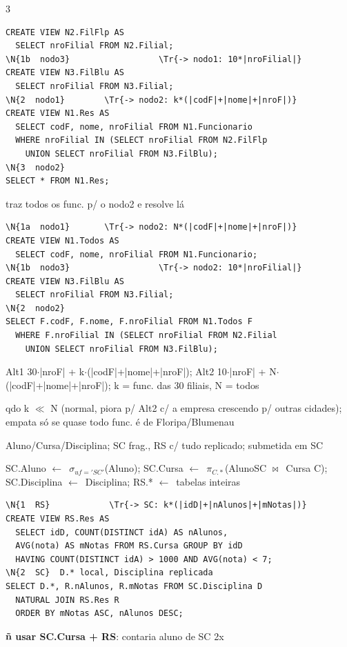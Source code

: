 \documentclass[a4paper]{article}
\newenvironment{dl}{\begin{description}[leftmargin=3.2mm,labelindent=0pt,itemsep=0.7pt,topsep=0.6pt,font=\color{tm}\bfseries,style=standard]}{\end{description}}
\newcommand{\sub}[1]{\par\vspace{1.4pt}{\color{hd}\bfseries\underline{#1}}\par}
\newcommand{\ans}[1]{\leavevmode{\color{ok}\bfseries #1}}
\newcommand{\at}[1]{{\color{wr}\bfseries #1}}
\newcommand{\la}{$\leftarrow$}
\newcommand{\q}[1]{{\ttfamily #1}}
\newcommand{\sel}{$\sigma$}
\newcommand{\pj}{$\pi$}
\newcommand{\jn}{$\bowtie$}
\newcommand{\N}[1]{\textcolor{nd}{\textbf{#1}}}
\newcommand{\Tr}[1]{\textcolor{tr}{#1}}
\begin{document}
\begin{multicols*}{3}
\begin{sql}
\begin{Verbatim}
CREATE VIEW N2.FilFlp AS
  SELECT nroFilial FROM N2.Filial;
\N{1b  nodo3}                  \Tr{-> nodo1: 10*|nroFilial|}
CREATE VIEW N3.FilBlu AS
  SELECT nroFilial FROM N3.Filial;
\N{2  nodo1}        \Tr{-> nodo2: k*(|codF|+|nome|+|nroF|)}
CREATE VIEW N1.Res AS
  SELECT codF, nome, nroFilial FROM N1.Funcionario
  WHERE nroFilial IN (SELECT nroFilial FROM N2.FilFlp
    UNION SELECT nroFilial FROM N3.FilBlu);
\N{3  nodo2}
SELECT * FROM N1.Res;
\end{Verbatim}
\end{sql}
\begin{dl}
\item[b) Alt2:] traz todos os func. p/ o nodo2 e resolve lá
\end{dl}
\begin{sql}
\begin{Verbatim}
\N{1a  nodo1}       \Tr{-> nodo2: N*(|codF|+|nome|+|nroF|)}
CREATE VIEW N1.Todos AS
  SELECT codF, nome, nroFilial FROM N1.Funcionario;
\N{1b  nodo3}                  \Tr{-> nodo2: 10*|nroFilial|}
CREATE VIEW N3.FilBlu AS
  SELECT nroFilial FROM N3.Filial;
\N{2  nodo2}
SELECT F.codF, F.nome, F.nroFilial FROM N1.Todos F
  WHERE F.nroFilial IN (SELECT nroFilial FROM N2.Filial
    UNION SELECT nroFilial FROM N3.FilBlu);
\end{Verbatim}
\end{sql}
\begin{dl}
\item[c)] Alt1 \Tr{30$\cdot$|nroF| + k$\cdot$(|codF|+|nome|+|nroF|)}; Alt2 \Tr{10$\cdot$|nroF| + N$\cdot$(|codF|+|nome|+|nroF|)}; k = func. das 30 filiais, N = todos
\item[d)] \ans{Alt1 ganha} qdo k $\ll$ N (normal, piora p/ Alt2 c/ a empresa crescendo p/ outras cidades); empata só se quase todo func. é de Floripa/Blumenau
\end{dl}
\sub{4.5} Aluno/Cursa/Disciplina; SC frag., RS c/ tudo replicado; submetida em SC
\begin{dl}
\item[a)] \q{SC.Aluno} \la\ \sel$_{uf='SC'}$(Aluno); \q{SC.Cursa} \la\ \pj$_{C.*}$(AlunoSC \jn\ Cursa C); \q{SC.Disciplina} \la\ Disciplina; \q{RS.*} \la\ tabelas inteiras
\end{dl}
\begin{sql}
\begin{Verbatim}
\N{1  RS}            \Tr{-> SC: k*(|idD|+|nAlunos|+|mNotas|)}
CREATE VIEW RS.Res AS
  SELECT idD, COUNT(DISTINCT idA) AS nAlunos,
  AVG(nota) AS mNotas FROM RS.Cursa GROUP BY idD
  HAVING COUNT(DISTINCT idA) > 1000 AND AVG(nota) < 7;
\N{2  SC}  D.* local, Disciplina replicada
SELECT D.*, R.nAlunos, R.mNotas FROM SC.Disciplina D
  NATURAL JOIN RS.Res R
  ORDER BY mNotas ASC, nAlunos DESC;
\end{Verbatim}
\end{sql}
\at{ñ usar SC.Cursa + RS}: contaria aluno de SC 2x


\end{multicols*}
\end{document}
